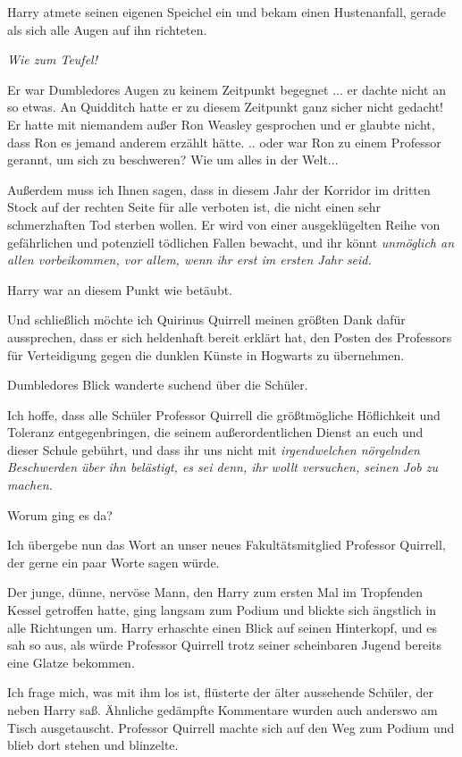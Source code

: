 Harry atmete seinen eigenen Speichel ein und bekam einen Hustenanfall, gerade
als sich alle Augen auf ihn richteten.

\emph{Wie zum Teufel! }

Er war Dumbledores Augen zu keinem Zeitpunkt begegnet ... er dachte nicht an so
etwas. An Quidditch hatte er zu diesem Zeitpunkt ganz sicher nicht gedacht! Er
hatte mit niemandem außer Ron Weasley gesprochen und er glaubte nicht, dass Ron
es jemand anderem erzählt hätte. .. oder war Ron zu einem Professor gerannt, um
sich zu beschweren? Wie um alles in der Welt...

\glqq Außerdem muss ich Ihnen sagen, dass in diesem Jahr der Korridor im dritten
Stock auf der rechten Seite für alle verboten ist, die nicht einen sehr
schmerzhaften Tod sterben wollen. Er wird von einer ausgeklügelten Reihe von
gefährlichen und potenziell tödlichen Fallen bewacht, und ihr könnt
\emph{unmöglich an allen vorbeikommen, vor allem, wenn ihr erst im ersten Jahr
seid.}\grqq{}

Harry war an diesem Punkt wie betäubt.

\glqq Und schließlich möchte ich Quirinus Quirrell meinen größten Dank dafür
aussprechen, dass er sich heldenhaft bereit erklärt hat, den Posten des
Professors für Verteidigung gegen die dunklen Künste in Hogwarts zu
übernehmen.\grqq{}

Dumbledores Blick wanderte suchend über die Schüler.

\glqq Ich hoffe, dass alle Schüler Professor Quirrell die größtmögliche
Höflichkeit und Toleranz entgegenbringen, die seinem außerordentlichen Dienst an
euch und dieser Schule gebührt, und dass ihr uns nicht mit \emph{irgendwelchen
nörgelnden Beschwerden über ihn belästigt, es sei denn, ihr wollt versuchen,
seinen Job zu machen.}\grqq{}

Worum ging es da?

\glqq Ich übergebe nun das Wort an unser neues Fakultätsmitglied Professor
Quirrell, der gerne ein paar Worte sagen würde.\grqq{}

Der junge, dünne, nervöse Mann, den Harry zum ersten Mal im Tropfenden Kessel
getroffen hatte, ging langsam zum Podium und blickte sich ängstlich in alle
Richtungen um. Harry erhaschte einen Blick auf seinen Hinterkopf, und es sah so
aus, als würde Professor Quirrell trotz seiner scheinbaren Jugend bereits eine
Glatze bekommen.

\glqq Ich frage mich, was mit ihm los ist\grqq{}, flüsterte der älter aussehende
Schüler, der neben Harry saß. Ähnliche gedämpfte Kommentare wurden auch anderswo
am Tisch ausgetauscht. Professor Quirrell machte sich auf den Weg zum Podium und
blieb dort stehen und blinzelte.

